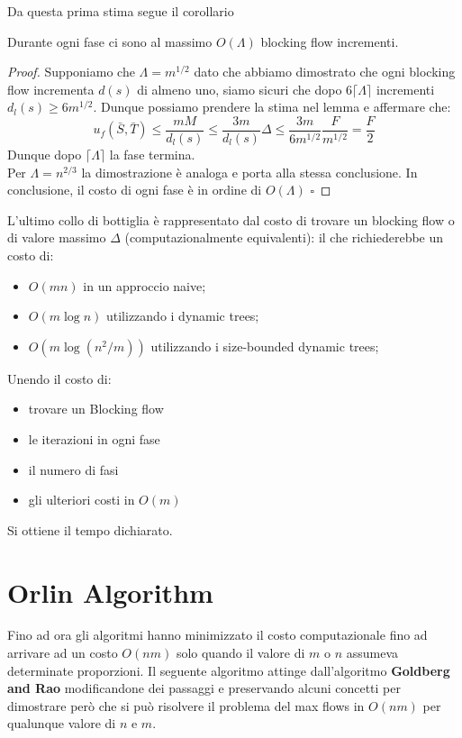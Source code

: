 \documentclass[a4paper, 11pt]{report}
\newcommand*{\QED}{\null\nobreak\hfill\ensuremath{\square}}%
\begin{document}
    Da questa prima stima segue il corollario
    \begin{corollary}{}{}
    Durante ogni fase ci sono al massimo $O(\Lambda)$ blocking flow incrementi.
    \end{corollary}
    \begin{proof}
        Supponiamo che $\Lambda = m^{1/2}$ dato che abbiamo dimostrato che ogni blocking flow incrementa $d(s)$ di almeno uno, siamo sicuri che dopo $6\lceil \Lambda\rceil$ incrementi $d_l(s) \ge 6 m^{1/2}$.
        Dunque possiamo prendere la stima nel lemma e affermare che:
        \[ u_f(\bar{S}, \bar{T})\le \frac{mM}{d_l(s)}\le \frac{3m}{d_l(s)}\Delta\le \frac{3m}{6m^{1/2}}\frac{F}{m^{1/2}} = \frac{F}{2}\]
        Dunque dopo $\lceil \Lambda\rceil$ la fase termina.\\
        Per $\Lambda = n^{2/3}$ la dimostrazione è analoga e porta alla stessa conclusione. 
        In conclusione, il costo di ogni fase è in ordine di $O(\Lambda)$ \QED
    \end{proof}
    
    L'ultimo collo di bottiglia è rappresentato dal costo di trovare un blocking flow o di valore massimo $\Delta$ (computazionalmente equivalenti):
    il che richiederebbe un costo di:
    \begin{itemize}
        \item $O(mn)$ in un approccio naive;
        \item $O(m\log n)$ utilizzando i dynamic trees;
        \item $O(m \log(n^2/m))$ utilizzando i size-bounded dynamic trees;
    \end{itemize}
    Unendo il costo di:
    \begin{itemize}[label=$\times$]
        \item trovare un Blocking flow
        \item le iterazioni in ogni fase
        \item il numero di fasi
        \item gli ulteriori costi in $O(m)$
    \end{itemize}
    Si ottiene il tempo dichiarato.











    \chapter{Orlin Algorithm}
Fino ad ora gli algoritmi hanno minimizzato il costo computazionale fino ad arrivare ad un costo $O(nm)$ solo quando il valore di $m$ o $n$ assumeva determinate proporzioni.
Il seguente algoritmo attinge dall'algoritmo \textbf{Goldberg and Rao} modificandone dei passaggi e preservando alcuni concetti per dimostrare però che si può risolvere il problema del max flows in $O(nm)$ per qualunque valore di $n$ e $m$.
\end{document}
